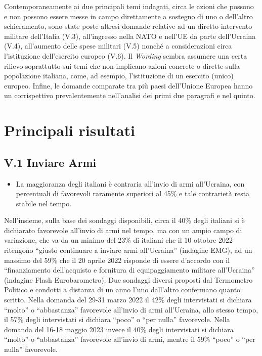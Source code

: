 \documentclass[
  openany]{book}
\providecommand{\tightlist}{%
  \setlength{\itemsep}{0pt}\setlength{\parskip}{0pt}}
\begin{document}
Contemporaneamente ai due principali temi indagati, circa le azioni che possono e non possono essere messe in campo direttamente a sostegno di uno o dell'altro schieramento, sono state poste altresì domande relative ad un diretto intervento militare dell'Italia (V.3), all'ingresso nella NATO e nell'UE da parte dell'Ucraina (V.4), all'aumento delle spese militari (V.5) nonché a considerazioni circa l'istituzione dell'esercito europeo (V.6). Il \emph{Wording} sembra assumere una certa rilievo soprattutto sui temi che non implicano azioni concrete o dirette sulla popolazione italiana, come, ad esempio, l'istituzione di un esercito (unico) europeo.
Infine, le domande comparate tra più paesi dell'Unione Europea hanno un corrispettivo prevalentemente nell'analisi dei primi due paragrafi e nel quinto.

\hypertarget{principali-risultati-3}{%
\section{Principali risultati}\label{principali-risultati-3}}

\hypertarget{v.1-inviare-armi}{%
\subsection{V.1 Inviare Armi}\label{v.1-inviare-armi}}

\begin{itemize}
\tightlist
\item
  La maggioranza degli italiani è contraria all'invio di armi all'Ucraina, con percentuali di favorevoli raramente superiori al 45\% e tale contrarietà resta stabile nel tempo.
\end{itemize}

Nell'insieme, sulla base dei sondaggi disponibili, circa il 40\% degli italiani si è dichiarato favorevole all'invio di armi nel tempo, ma con un ampio campo di variazione, che va da un minimo del 23\% di italiani che il 10 ottobre 2022 ritengono ``giusto continuare a inviare armi all'Ucraina'' (indagine EMG), ad un massimo del 59\% che il 20 aprile 2022 risponde di essere d'accordo con il ``finanziamento dell'acquisto e fornitura di equipaggiamento militare all'Ucraina'' (indagine Flash Eurobarometro). Due sondaggi diversi proposti dal Termometro Politico e condotti a distanza di un anno l'uno dall'altro confermano quanto scritto. Nella domanda del 29-31 marzo 2022 il 42\% degli intervistati si dichiara ``molto'' o ``abbastanza'' favorevole all'invio di armi all'Ucraina, allo stesso tempo, il 57\% degli intervistati si dichiara ``poco'' o ``per nulla'' favorevole. Nella domanda del 16-18 maggio 2023 invece il 40\% degli intervistati si dichiara ``molto'' o ``abbastanza'' favorevole all'invio di armi, mentre il 59\% ``poco'' o ``per nulla'' favorevole.
\end{document}
